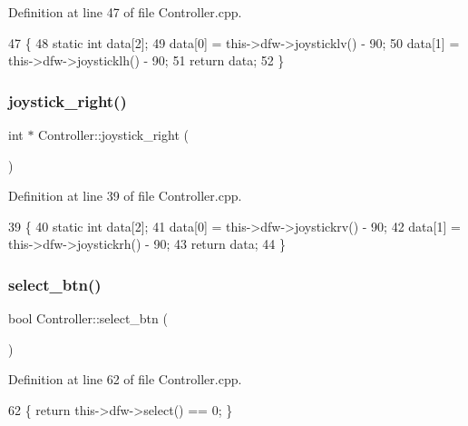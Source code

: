 Definition at line 47 of file Controller.\+cpp.


\begin{DoxyCode}
47                                \{
48     \textcolor{keyword}{static} \textcolor{keywordtype}{int} data[2];
49     data[0] = this->dfw->joysticklv() - 90;
50     data[1] = this->dfw->joysticklh() - 90;
51     \textcolor{keywordflow}{return} data;
52 \}
\end{DoxyCode}
\mbox{\label{class_controller_a1f02ff9e9853dd53232df37f6676b0dc}} 
\subsubsection{\texorpdfstring{joystick\+\_\+right()}{joystick\_right()}}
{\footnotesize\ttfamily int $\ast$ Controller\+::joystick\+\_\+right (\begin{DoxyParamCaption}{ }\end{DoxyParamCaption})}



Definition at line 39 of file Controller.\+cpp.


\begin{DoxyCode}
39                                 \{
40     \textcolor{keyword}{static} \textcolor{keywordtype}{int} data[2];
41     data[0] = this->dfw->joystickrv() - 90;
42     data[1] = this->dfw->joystickrh() - 90;
43     \textcolor{keywordflow}{return} data;
44 \}
\end{DoxyCode}
\mbox{\label{class_controller_aa94980f9d72b8b3d61f05641e82710ba}} 
\subsubsection{\texorpdfstring{select\+\_\+btn()}{select\_btn()}}
{\footnotesize\ttfamily bool Controller\+::select\+\_\+btn (\begin{DoxyParamCaption}{ }\end{DoxyParamCaption})}



Definition at line 62 of file Controller.\+cpp.


\begin{DoxyCode}
62 \{ \textcolor{keywordflow}{return} this->dfw->select() == 0; \}
\end{DoxyCode}
\mbox{\label{class_controller_acde5cc2b40d1cc9e451a704ec1811b53}} 
